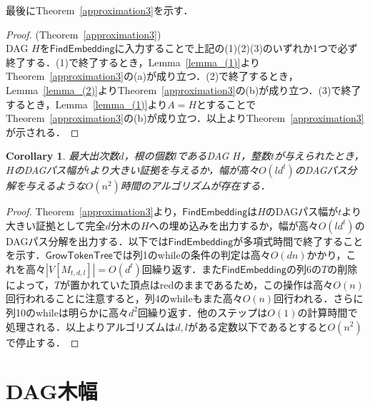 \documentclass[master]{kuisthesis}		%
\theoremstyle{plain}
\newtheorem{cor}{Corollary}
\theoremstyle{definition}
\begin{document}
最後にTheorem~\ref{approximation3}を示す．

\begin{proof}(Theorem~\ref{approximation3})\\
    DAG $H$を$\mathsf{FindEmbedding}$に入力することで上記の(1)(2)(3)のいずれか1つで必ず終了する．(1)で終了するとき，Lemma~\ref{lemma_(1)}よりTheorem~\ref{approximation3}の(a)が成り立つ．(2)で終了するとき，Lemma~\ref{lemma_(2)}よりTheorem~\ref{approximation3}の(b)が成り立つ．(3)で終了するとき，Lemma~\ref{lemma_(1)}より$A=H$とすることでTheorem~\ref{approximation3}の(b)が成り立つ．以上よりTheorem~\ref{approximation3}が示される．
\end{proof}




\begin{cor}
    最大出次数$d$，根の個数$l$であるDAG $H$，整数$t$が与えられたとき，$H$のDAGパス幅が$t$より大きい証拠を与えるか，幅が高々$O(ld^t)$のDAGパス分解を与えるような$O(n^2)$時間のアルゴリズムが存在する．
\end{cor}

\begin{proof}
    Theorem~\ref{approximation3}より，$\mathsf{FindEmbedding}$は$H$のDAGパス幅が$t$より大きい証拠として完全$d$分木の$H$への埋め込みを出力するか，幅が高々$O(ld^t)$のDAGパス分解を出力する．以下では$\mathsf{FindEmbedding}$が多項式時間で終了することを示す．$\mathsf{GrowTokenTree}$では列1のwhileの条件の判定は高々$O(dn)$かかり，これを高々$|V[M_{t, d, l}]| = O(d^t)$回繰り返す．また$\mathsf{FindEmbedding}$の列6の$T$の削除によって，$T$が置かれていた頂点はredのままであるため，この操作は高々$O(n)$回行われることに注意すると，列4のwhileもまた高々$O(n)$回行われる．さらに列10のwhileは明らかに高々$d^2$回繰り返す．他のステップは$O(1)$の計算時間で処理される．以上よりアルゴリズムは$d, l$がある定数以下であるとすると$O(n^2)$で停止する．
\end{proof}



















\section{DAG木幅} %
\end{document}
